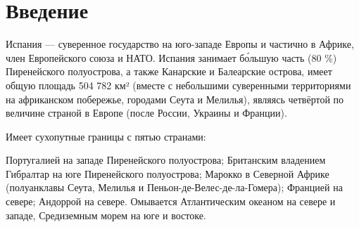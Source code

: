 \chapter*{Введение}
\label{sec:afterwords}

Испания — суверенное государство на юго-западе Европы и частично в Африке, член Европейского союза и НАТО. Испания занимает бо́льшую часть (80 \%) Пиренейского полуострова, а также Канарские и Балеарские острова, имеет общую площадь 504 782 км² (вместе с небольшими суверенными территориями на африканском побережье, городами Сеута и Мелилья), являясь четвёртой по величине страной в Европе (после России, Украины и Франции).

Имеет сухопутные границы с пятью странами:

Португалией на западе Пиренейского полуострова;
Британским владением Гибралтар на юге Пиренейского полуострова;
Марокко в Северной Африке (полуанклавы Сеута, Мелилья и Пеньон-де-Велес-де-ла-Гомера);
Францией на севере;
Андоррой на севере.
Омывается Атлантическим океаном на севере и западе, Средиземным морем на юге и востоке.


